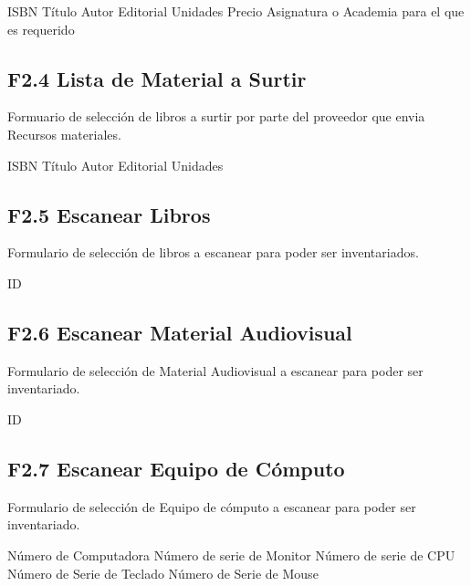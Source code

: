 \begin{UClist}
	\UCli ISBN
	\UCli Título
	\UCli Autor
	\UCli Editorial
	\UCli Unidades
	\UCli Precio
	\UCli Asignatura o Academia para el que es requerido
\end{UClist}


\subsection{F2.4 Lista de Material a Surtir}
Formuario de selección de libros a surtir por parte del proveedor que envia Recursos materiales.\\

\begin{UClist}
	\UCli ISBN
	\UCli Título
	\UCli Autor
	\UCli Editorial
	\UCli Unidades
\end{UClist}

\subsection{F2.5 Escanear Libros}
Formulario de selección de libros a escanear para poder ser inventariados.\\

\begin{UClist}
	\UCli ID
\end{UClist}

\subsection{F2.6 Escanear Material Audiovisual}
Formulario de selección de Material Audiovisual a escanear para poder ser inventariado.\\

\begin{UClist}
	\UCli ID
\end{UClist}

\subsection{F2.7 Escanear Equipo de Cómputo}
Formulario de selección de Equipo de cómputo a escanear para poder ser inventariado.\\

\begin{UClist}
	\UCli Número de Computadora
	\UCli Número de serie de Monitor
	\UCli Número de serie de CPU
	\UCli Número de Serie de Teclado
	\UCli Número de Serie de Mouse
\end{UClist}




